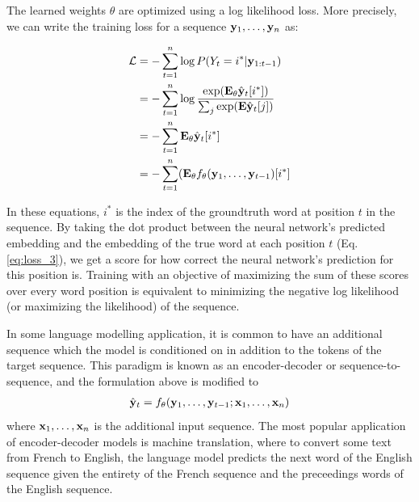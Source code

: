 The learned weights $\theta$ are optimized using a log likelihood loss.
More precisely, we can write the training loss for a sequence $\mathbf{y}_1, \ldots, \mathbf{y}_n$ as:

\begin{align}
\mathcal{L} &= -\sum_{t=1}^n \log P(Y_t=i^* | \mathbf{y}_{1:t-1}) \\
&= -\sum_{t=1}^n \log\frac{\exp(\mathbf{E}_\theta\hat{\mathbf{y}}_t[i^*])}{\sum_j\exp(\mathbf{E}\hat{\mathbf{y}}_t[j])} \label{eq:loss_2} \\
&= -\sum_{t=1}^n \mathbf{E}_\theta\hat{\mathbf{y}}_t[i^*] \label{eq:loss_3} \\
&= -\sum_{t=1}^n (\mathbf{E}_\theta f_\theta(\mathbf{y}_1, \ldots, \mathbf{y}_{t-1})[i^*]
\end{align}

In these equations, $i^*$ is the index of the groundtruth word at position $t$ in the sequence. 
By taking the dot product between the neural network's predicted embedding and the embedding of the true word at each position $t$ (Eq. \ref{eq:loss_3}), we get a score for how correct the neural network's prediction for this position is.
Training with an objective of maximizing the sum of these scores over every word position is equivalent to minimizing the negative log likelihood (or maximizing the likelihood) of the sequence.

In some language modelling application, it is common to have an additional sequence which the model is conditioned on in addition to the tokens of the target sequence.
This paradigm is known as an encoder-decoder or sequence-to-sequence, and the formulation above is modified to
\begin{align}
    \hat{\mathbf{y}}_t = f_\theta(\mathbf{y}_1, \ldots, \mathbf{y}_{t-1}; \mathbf{x}_1, \ldots, \mathbf{x}_n)
    \label{eq:cond_lm_feq}
\end{align}
where $\mathbf{x}_1, \ldots, \mathbf{x}_n$ is the additional input sequence. 
The most popular application of encoder-decoder models is machine translation, where to convert some text from French to English, the language model predicts the next word of the English sequence given the entirety of the French sequence and the preceedings words of the English sequence.

